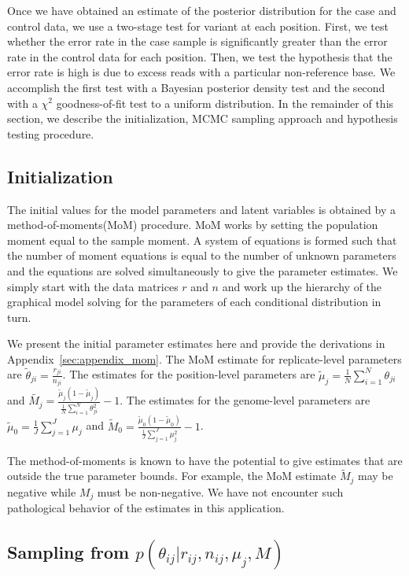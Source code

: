 \documentclass[11pt,reqno]{amsart}
\begin{document}
Once we have obtained an estimate of the posterior distribution for the case and control data, we use a two-stage test for variant at each position. First, we test whether the error rate in the case sample is significantly greater than the error rate in the control data for each position. Then, we test the hypothesis that the error rate is high is due to excess reads with a particular non-reference base. We accomplish the first test with a Bayesian posterior density test and the second with a $\chi^2$ goodness-of-fit test to a uniform distribution. In the remainder of this section, we describe the initialization, MCMC sampling approach and hypothesis testing procedure.

\subsection{Initialization}
The initial values for the model parameters and latent variables is obtained by a method-of-moments(MoM) procedure. MoM works by setting the population moment equal to the sample moment. A system of equations is formed such that the number of moment equations is equal to the number of unknown parameters and the equations are solved simultaneously to give the parameter estimates. We simply start with the data matrices $r$ and $n$ and work up the hierarchy of the graphical model solving for the parameters of each conditional distribution in turn.

We present the initial parameter estimates here and provide the derivations in Appendix~\ref{sec:appendix_mom}. The MoM estimate for replicate-level parameters are $\tilde{\theta}_{ji} = \frac{r_{ji}} {n_{ji}}$. The estimates for the position-level parameters are $\tilde{\mu}_j = \frac{1}{N} \sum_{i=1}^N \theta_{ji}$ and $\tilde{M_j} = \frac{ \tilde{\mu}_j (1 - \tilde{\mu}_j ) } { \frac{1}{N} \sum_{i=1}^N \theta_{ji}^2 } -1$. The estimates for the genome-level parameters are $\tilde{\mu}_0 = \frac{1}{J} \sum_{j=1}^J \mu_j$ and $\tilde{M}_0 = \frac{ \tilde{\mu}_0 (1 - \tilde{\mu}_0 ) } {\frac{1}{J} \sum_{j=1}^J \mu_j^2 } -1$.

The method-of-moments is known to have the potential to give estimates that are outside the true parameter bounds. For example, the MoM estimate $\tilde{M}_j$ may be negative while $M_j$ must be non-negative. We have not encounter such pathological behavior of the estimates in this application. 

\subsection{Sampling from $p \left( \theta_{ij} |r_{ij},n_{ij},\mu_j,M \right)$}\
\end{document}
